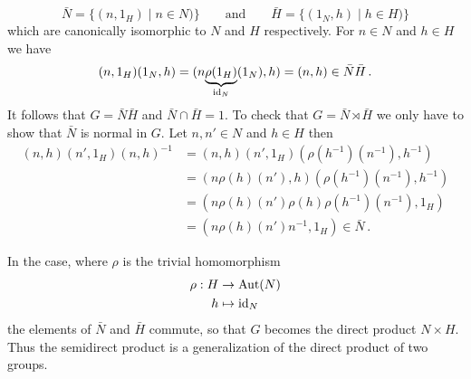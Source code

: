 \[
  \bar N=\{(n,1_H)\mid n\in N)\}
  \qquad\text{and}\qquad
  \bar H=\{(1_N,h)\mid h\in H)\}
\]
which are canonically isomorphic to $N$ and $H$ respectively. For $n\in N$ and
$h\in H$ we have
\[
  (n,1_H)(1_N,h)=(n\underset{\operatorname{id}_N}{\underbrace{\rho(1_H)}}(1_N),h)
  =(n,h)\in \bar N\bar H \,.
\]
It follows that $G=\bar N\bar H$ and $\bar N\cap\bar H=1$. To check that
$G=\bar N\rtimes\bar H$ we only have to show that $\bar N$ is normal in $G$.
Let $n,n'\in N$ and $h\in H$ then
\begin{align*}
  (n,h)(n',1_H)(n,h)^{-1}
  &=(n,h)(n',1_H)(\rho(h^{-1})(n^{-1}),h^{-1})
  \\&=(n\rho(h)(n'),h)(\rho(h^{-1})(n^{-1}),h^{-1})
  \\&=(n\rho(h)(n')\rho(h)\rho(h^{-1})(n^{-1}),1_H)
  \\&=(n\rho(h)(n')n^{-1},1_H) \in \bar N \,.
\end{align*}

In the case, where $\rho$ is the trivial homomorphism
\begin{align*}
  \rho:H&\to\operatorname{Aut}(N)
\\h&\mapsto \operatorname{id}_N
\end{align*}
the elements of $\bar N$ and $\bar H$ commute, so that $G$ becomes the direct
product $N\times H$. Thus the semidirect product is a generalization of the
direct product of two groups.


